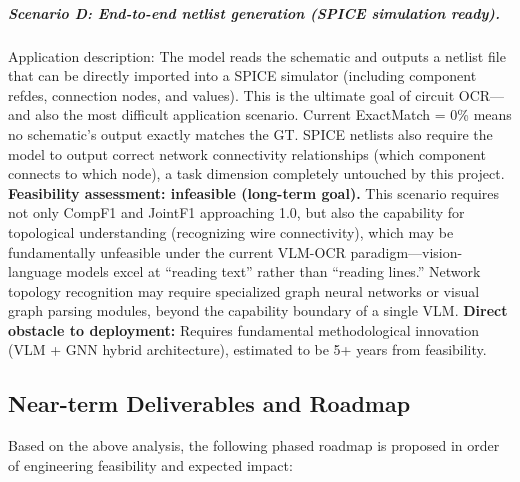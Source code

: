 \subparagraph{Scenario D: End-to-end netlist generation (SPICE simulation ready).}
Application description: The model reads the schematic and outputs a netlist file that can be directly imported into a SPICE simulator (including component refdes, connection nodes, and values). This is the ultimate goal of circuit OCR---and also the most difficult application scenario. Current ExactMatch = 0\% means no schematic's output exactly matches the GT. SPICE netlists also require the model to output correct network connectivity relationships (which component connects to which node), a task dimension completely untouched by this project.
\textbf{Feasibility assessment: infeasible (long-term goal).} This scenario requires not only CompF1 and JointF1 approaching 1.0, but also the capability for topological understanding (recognizing wire connectivity), which may be fundamentally unfeasible under the current VLM-OCR paradigm---vision-language models excel at ``reading text'' rather than ``reading lines.'' Network topology recognition may require specialized graph neural networks or visual graph parsing modules, beyond the capability boundary of a single VLM.
\textbf{Direct obstacle to deployment:} Requires fundamental methodological innovation (VLM + GNN hybrid architecture), estimated to be 5+ years from feasibility.

\subsection{Near-term Deliverables and Roadmap}

Based on the above analysis, the following phased roadmap is proposed in order of engineering feasibility and expected impact:


